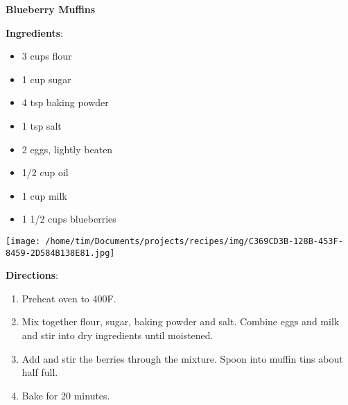 \documentclass[11pt, twoside, openany]{book}
\begin{document}
\noindent\begin{minipage}[t]{\linewidth}%
{\Large\textbf{Blueberry Muffins}} \label{blueberry-muffins}\hfill\textit{}\\
\noindent\begin{minipage}[t]{0.78\linewidth}%
\textbf{Ingredients}:\vspace{-3mm}
\begin{multicols}{2}
\begin{itemize}\setlength\itemsep{-1mm}
\item 3 cups flour
\item 1 cup sugar
\item 4 tsp baking powder
\item 1 tsp salt
\item 2 eggs, lightly beaten
\item 1/2 cup oil
\item 1 cup milk
\item 1 1/2 cups blueberries
\end{itemize}
\end{multicols}
\end{minipage}
\noindent\begin{minipage}[t]{0.18\linewidth}
\centering \strut\vspace*{-\baselineskip}\newline
\texttt{[image: /home/tim/Documents/projects/recipes/img/C369CD3B-128B-453F-8459-2D584B138E81.jpg]}\\
\end{minipage}\vspace{3mm}
\textbf{Directions}:
\vspace{-3mm}\begin{enumerate}\setlength\itemsep{-1mm}
\item Preheat oven to 400F.
\item Mix together flour, sugar, baking powder and salt. Combine eggs and milk and stir into dry ingredients until moistened.
\item Add and stir the berries through the mixture. Spoon into muffin tins about half full.
\item Bake for 20 minutes.
\end{enumerate}
\end{minipage}\vspace{8mm}
\end{document}
